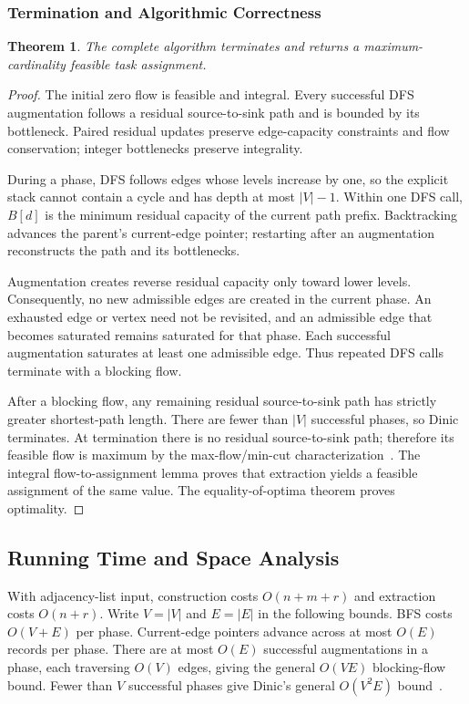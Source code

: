 \documentclass[conference]{IEEEtran}
\newtheorem{theorem}{Theorem}
\theoremstyle{definition}
\theoremstyle{remark}
\begin{document}
\subsubsection{Termination and Algorithmic Correctness}
\begin{theorem}
The complete algorithm terminates and returns a maximum-cardinality feasible
task assignment.
\end{theorem}
\begin{proof}
The initial zero flow is feasible and integral. Every successful DFS
augmentation follows a residual source-to-sink path and is bounded by its
bottleneck. Paired residual updates preserve edge-capacity constraints and
flow conservation; integer bottlenecks preserve integrality.

During a phase, DFS follows edges whose levels increase by one, so the
explicit stack cannot contain a cycle and has depth at most $|V|-1$.
Within one DFS call, $B[d]$ is the minimum residual capacity of the current
path prefix. Backtracking advances the parent's current-edge pointer;
restarting after an augmentation reconstructs the path and its bottlenecks.

Augmentation creates reverse residual capacity only toward lower levels.
Consequently, no new admissible edges are created in the current phase.
An exhausted edge or vertex need not be revisited, and an admissible edge
that becomes saturated remains saturated for that phase. Each successful
augmentation saturates at least one admissible edge. Thus repeated DFS
calls terminate with a blocking flow.

After a blocking flow, any remaining residual source-to-sink path has
strictly greater shortest-path length. There are fewer than $|V|$
successful phases, so Dinic terminates. At termination there is no residual
source-to-sink path; therefore its feasible flow is maximum by the
max-flow/min-cut characterization~\cite{ford1956}. The integral
flow-to-assignment lemma proves that extraction yields a feasible assignment
of the same value. The equality-of-optima theorem proves optimality.
\end{proof}

\subsection{Running Time and Space Analysis}
With adjacency-list input, construction costs $O(n+m+r)$ and extraction costs
$O(n+r)$. Write $V=|V|$ and $E=|E|$ in the following bounds. BFS costs
$O(V+E)$ per phase. Current-edge pointers advance across at most $O(E)$
records per phase. There are at most $O(E)$ successful augmentations in a
phase, each traversing $O(V)$ edges, giving the general $O(VE)$ blocking-flow
bound. Fewer than $V$ successful phases give Dinic's general $O(V^2E)$
bound~\cite{dinic1970,ahuja1993}.
\end{document}
